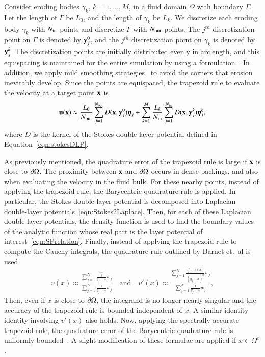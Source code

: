 \documentclass[preprint, 10pt]{elsarticle}
\begin{document}
Consider eroding bodies $\gamma_k$, $k=1,\ldots,M$, in a fluid domain
$\Omega$ with boundary $\Gamma$.  Let the length of $\Gamma$ be $L_{0}$,
and the length of $\gamma_k$ be $L_k$.  We discretize each eroding body
$\gamma_k$ with $N_{\mathrm{in}}$ points and discretize $\Gamma$ with $N_{\mathrm{out}}$
points.  The $j^{th}$ discretization point on $\Gamma$ is denoted by
${\mathbf{y}}_j^0$, and the $j^{th}$ discretization point on $\gamma_k$ is
denoted by ${\mathbf{y}}^k_j$.  The discretization points are initially
distributed evenly in arclength, and this equispacing is maintained for
the entire simulation by using a {\thL}
formulation~\cite{hou-low-she1994}.  In addition, we apply mild
smoothing strategies~\cite{qua-moo2018} to avoid the corners that
erosion inevitably develop.    Since the points are equispaced, the
trapezoid rule to evaluate the velocity at a target point ${\mathbf{x}}$ is
\begin{align}
  \label{eqn:trap}
  {\mathbf{u}}({\mathbf{x}}) \approx \frac{L_0}{N_{\mathrm{out}}} \sum_{j=1}^{N_{\mathrm{out}}} 
    D({\mathbf{x}},{\mathbf{y}}^0_j) {\boldsymbol\eta}_j +
  \sum_{k=1}^M \frac{L_k}{N_{\mathrm{in}}} \sum_{j=1}^{N_{\mathrm{in}}}
    D({\mathbf{x}},{\mathbf{y}}^k_j) {\boldsymbol\eta}^k_j,
\end{align}
where $D$ is the kernel of the Stokes double-layer potential defined in
Equation~\eqref{eqn:stokesDLP}.

As previously mentioned, the quadrature error of the trapezoid rule is
large if ${\mathbf{x}}$ is close to ${\partial}\Omega$.  The proximity between ${\mathbf{x}}$ and
${\partial}\Omega$ occurs in dense packings, and also when evaluating the
velocity in the fluid bulk.  For these nearby points, instead of
applying the trapezoid rule, the Barycentric quadrature rule is applied.
In particular, the Stokes double-layer potential is decomposed into
Laplacian double-layer potentials~\eqref{eqn:Stokes2Laplace}.  Then, for
each of these Laplacian double-layer potentials, the density function is
used to find the boundary values of the analytic function whose real
part is the layer potential of interest~\eqref{eqn:SPrelation}.
Finally, instead of applying the trapezoid rule to compute the Cauchy
integrals, the quadrature rule outlined by Barnet et.~al is used
\begin{align}
  v(x) \approx \frac{\sum\limits_{j=1}^N \frac{v_j^-}{y_j-x}w_j}
    {\sum\limits_{j=1}^N \frac{1}{y_j-x}w_j}
  \quad \text{and} \quad
  v'(x) \approx \frac{\sum\limits_{j=1}^N 
    \frac{v_j^- - v(x)}{(y_j - x)^2}w_j}
    {\sum\limits_{j=1}^N \frac{1}{y_j-x}w_j}, 
  \label{eqn:vvpQuadrature}
\end{align}
Then, even if $x$ is close to ${\partial}\Omega$, the integrand is no longer
nearly-singular and the accuracy of the trapezoid rule is bounded
independent of $x$.  A similar identity identity involving $v'(x)$ also
holds.   Now, applying the spectrally accurate trapezoid rule, the
quadrature error of the Barycentric quadrature rule
is uniformly bounded~\cite{bar-wu-vee2015}.  A slight modification of
these formulae are applied if $x \in \Omega^{c}$.
\end{document}
